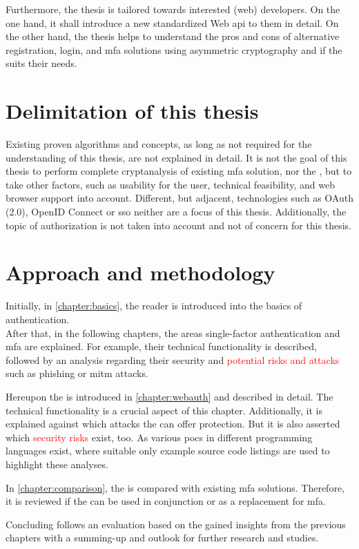 Furthermore, the thesis is tailored towards interested (web) developers. On the one hand, it shall introduce a new standardized Web \gls{api} to them in detail. On the other hand, the thesis helps to understand the pros and cons of alternative registration, login, and \gls{mfa} solutions using asymmetric cryptography and if the \wa{} suits their needs.

\section{Delimitation of this thesis}

Existing proven algorithms and concepts, as long as not required for the understanding of this thesis, are not explained in detail. It is not the goal of this thesis to perform complete cryptanalysis of existing \gls{mfa} solution, nor the \wa, but to take other factors, such as usability for the user, technical feasibility, and web browser support into account. Different, but adjacent, technologies such as OAuth (2.0), OpenID Connect or \gls{sso} neither are a focus of this thesis. Additionally, the topic of authorization is not taken into account and not of concern for this thesis. 

\section{Approach and methodology}

Initially, in \autoref{chapter:basics}, the reader is introduced into the basics of authentication.\\
After that, in the following chapters, the areas single-factor authentication and \gls{mfa} are explained. For example, their technical functionality is described, followed by an analysis regarding their security and \textcolor{red}{potential risks and attacks} such as phishing or \gls{mitm} attacks.

Hereupon the \wa{} is introduced in \autoref{chapter:webauth} and described in detail. The technical functionality is a crucial aspect of this chapter. Additionally, it is explained against which attacks the \wa{} can offer protection. But it is also asserted which \textcolor{red}{security risks} exist, too. As various \glspl{poc} in different programming languages exist, where suitable only example source code listings are used to highlight these analyses.

In \autoref{chapter:comparison}, the \wa{} is compared with existing \gls{mfa} solutions. Therefore, it is reviewed if the \wa{} can be used in conjunction or as a replacement for \gls{mfa}.

Concluding follows an evaluation based on the gained insights from the previous chapters with a summing-up and outlook for further research and studies.
